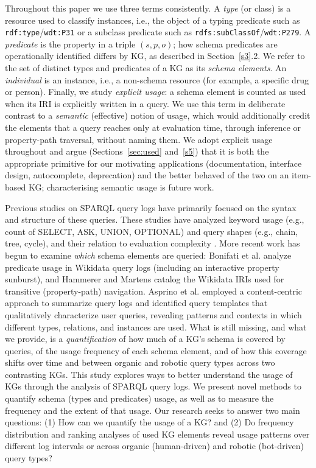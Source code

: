 \documentclass[sw]{iosart2x}
\begin{document}
Throughout this paper we use three terms consistently. A \emph{type} (or class) is a resource used to classify instances, i.e., the object of a typing predicate such as \texttt{rdf:type}/\texttt{wdt:P31} or a subclass predicate such as \texttt{rdfs:subClassOf}/\texttt{wdt:P279}. A \emph{predicate} is the property in a triple $(s,p,o)$; how schema predicates are operationally identified differs by KG, as described in Section~\ref{s3}.2. We refer to the set of distinct types and predicates of a KG as its \emph{schema elements}. An \emph{individual} is an instance, i.e., a non-schema resource (for example, a specific drug or person). Finally, we study \emph{explicit usage}: a schema element is counted as used when its IRI is explicitly written in a query. We use this term in deliberate contrast to a \emph{semantic} (effective) notion of usage, which would additionally credit the elements that a query reaches only at evaluation time, through inference or property-path traversal, without naming them. We adopt explicit usage throughout and argue (Sections~\ref{sec:used} and~\ref{s5}) that it is both the appropriate primitive for our motivating applications (documentation, interface design, autocomplete, deprecation) and the better behaved of the two on an item-based KG; characterising semantic usage is future work.

Previous studies on SPARQL query logs have primarily focused on the syntax and structure of these queries. These studies have analyzed keyword usage (e.g., count of SELECT, ASK, UNION, OPTIONAL) and query shapes (e.g., chain, tree, cycle), and their relation to evaluation complexity \cite{bonifati2020analytical, buil2015preliminary, saleem2015lsq,stadler2024lsq}. More recent work has begun to examine \emph{which} schema elements are queried: Bonifati et al. \cite{bonifati2019navigating} analyze predicate usage in Wikidata query logs (including an interactive property sunburst), and Hammerer and Martens \cite{hammerer2025compendium} catalog the Wikidata IRIs used for transitive (property-path) navigation. Asprino et al. \cite{asprino2023your} employed a content-centric approach to summarize query logs and identified query templates that qualitatively characterize user queries, revealing patterns and contexts in which different types, relations, and instances are used. What is still missing, and what we provide, is a \emph{quantification} of how much of a KG's schema is covered by queries, of the usage frequency of each schema element, and of how this coverage shifts over time and between organic and robotic query types across two contrasting KGs.
This study explores ways to better understand the usage of KGs through the analysis of SPARQL query logs. We present novel methods to quantify schema (types and predicates) usage, as well as to measure the frequency and the extent of that usage. Our research seeks to answer two main questions: (1) How can we quantify the usage of a KG? and (2) Do frequency distribution and ranking analyses of used KG elements reveal usage patterns over different log intervals or across organic (human-driven) and robotic (bot-driven) query types?
\end{document}
